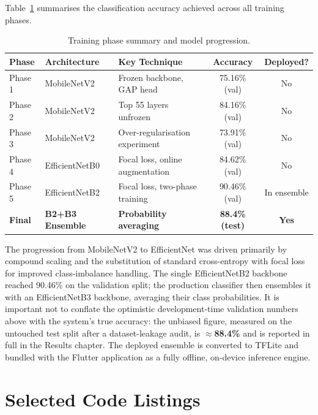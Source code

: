 Table~\ref{tab:model_summary} summarises the classification accuracy achieved across all training phases.

\begin{table}[H]
\centering
\caption{Training phase summary and model progression.}
\label{tab:model_summary}
\begin{tabular}{|l|l|l|c|c|}
\hline
\textbf{Phase} & \textbf{Architecture} & \textbf{Key Technique} & \textbf{Accuracy} & \textbf{Deployed?} \\ \hline
Phase 1 & MobileNetV2 & Frozen backbone, GAP head & 75.16\% (val) & No \\ \hline
Phase 2 & MobileNetV2 & Top 55 layers unfrozen & 84.16\% (val) & No \\ \hline
Phase 3 & MobileNetV2 & Over-regularisation experiment & 73.91\% (val) & No \\ \hline
Phase 4 & EfficientNetB0 & Focal loss, online augmentation & 84.62\% (val) & No \\ \hline
Phase 5 & EfficientNetB2 & Focal loss, two-phase training & 90.46\% (val) & In ensemble \\ \hline
\textbf{Final} & \textbf{B2+B3 Ensemble} & \textbf{Probability averaging} & \textbf{88.4\% (test)} & \textbf{Yes} \\ \hline
\end{tabular}
\end{table}

The progression from MobileNetV2 to EfficientNet was driven primarily by
compound scaling and the substitution of standard cross-entropy with focal loss
for improved class-imbalance handling. The single EfficientNetB2 backbone reached
90.46\% on the validation split; the production classifier then ensembles it with
an EfficientNetB3 backbone, averaging their class probabilities. It is important
not to conflate the optimistic development-time validation numbers above with the
system's true accuracy: the unbiased figure, measured on the untouched test split
after a dataset-leakage audit, is $\approx$\textbf{88.4\%} and is reported in full
in the Results chapter. The deployed ensemble is converted to TFLite and bundled
with the Flutter application as a fully offline, on-device inference engine.


\appendix
\chapter{Selected Code Listings}
\label{app:code}

